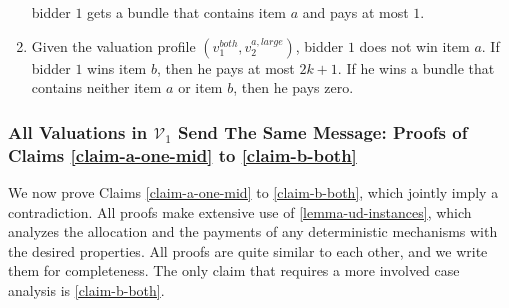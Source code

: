 \begin{lemma}
\begin{enumerate}
bidder $1$ gets a bundle that contains item $a$ and pays at most $1$. \label{item-6-ud}
\item Given the valuation profile $(v_1^{both},v_2^{a,large})$, bidder $1$ does not win item $a$.  If bidder $1$ wins item $b$, then he pays at most $2k+1$. If he wins a bundle that contains neither item $a$ or item $b$, then he pays zero. \label{item-complicated-ud}
    \end{enumerate}
\end{lemma}
\subsubsection[All Valuations in V\_1 Send The Same Message: Proofs of Claims \ref{claim-a-one-mid} to \ref{claim-b-both}]{All Valuations in $\mathcal V_1$ Send The Same Message: Proofs of Claims \ref{claim-a-one-mid} to \ref{claim-b-both}}\label{app-claims-proofs-ud}
We now prove Claims \ref{claim-a-one-mid} to \ref{claim-b-both}, which jointly imply a contradiction. All proofs make extensive use of \cref{lemma-ud-instances}, which analyzes the allocation and the payments of any deterministic mechanisms with the desired properties. All proofs are quite similar to each other, and we write them for completeness. The only claim that requires a more involved case analysis is \cref{claim-b-both}.

